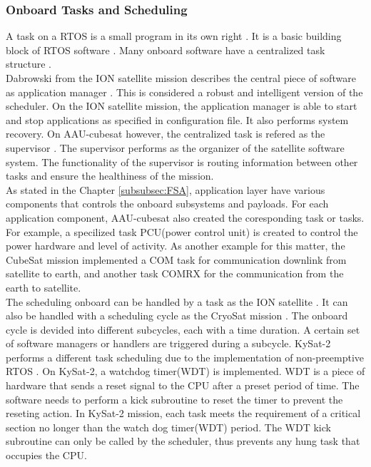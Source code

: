 \documentclass[a4paper]{article}
\begin{document}
\subsubsection{Onboard Tasks and Scheduling}

A task on a RTOS is a small program in its own right \cite{freeRTOS}. It is a basic building block of RTOS software \cite{tasks}. Many onboard software have a centralized task structure \cite{cadh-architecture}\cite{Schor2009-px}. \\
\indent Dabrowski from the ION satellite mission describes the central piece of software as application manager \cite{UIUC-sat}. This is considered a robust and intelligent version of the scheduler. On the ION satellite mission, the application manager is able to start and stop applications as specified in configuration file. It also performs system recovery. On AAU-cubesat however, the centralized task is refered as the supervisor \cite{AAU}. The supervisor performs as the organizer of the satellite software system. The functionality of the supervisor is routing information between other tasks and ensure the healthiness of the mission. \\ 
\indent As stated in the Chapter \ref{subsubsec:FSA}, application layer have various components that controls the onboard subsystems and payloads. For each application component, AAU-cubesat also created the coresponding task or tasks. For example, a specilized task PCU(power control unit) is created to control the power hardware and level of activity. As another example for this matter, the CubeSat mission implemented a COM task for communication downlink from satellite to earth, and another task COMRX for the communication from the earth to satellite. \\
\indent The scheduling onboard can be handled by a task as the ION satellite \cite{UIUC-sat}. It can also be handled with a scheduling cycle as the CryoSat mission \cite{obc-book}. The onboard cycle is devided into different subcycles, each with a time duration. A certain set of software managers or handlers are triggered during a subcycle. KySat-2 performs a different task scheduling due to the implementation of non-preemptive RTOS \cite{KySat-2}. On KySat-2, a watchdog timer(WDT) is implemented. WDT is a piece of hardware that sends a reset signal to the CPU after a preset period of time. The software needs to perform a kick subroutine to reset the timer to prevent the reseting action. In KySat-2 mission, each task meets the requirement of a critical section no longer than the watch dog timer(WDT) period. The WDT kick subroutine can only be called by the scheduler, thus prevents any hung task that occupies the CPU.\\
\end{document}
